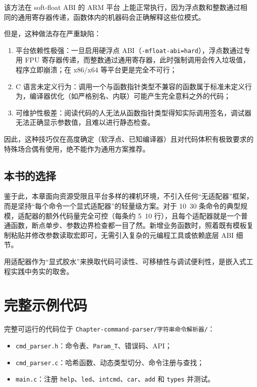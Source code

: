 该方法在 soft-float ABI 的 ARM 平台 上能正常执行，因为浮点数和整数通过相同的通用寄存器传递，函数体内的机器码会正确解释这些位模式。

但是，这种做法存在严重缺陷：

\begin{enumerate}
	\item 平台依赖性极强：一旦启用硬浮点 ABI（\texttt{-mfloat-abi=hard}），浮点数通过专用 FPU 寄存器传递，而整数通过通用寄存器，此时强制调用会传入垃圾值，程序立即崩溃；在 x86/x64 等平台更是完全不可行；
	\item C 语言未定义行为：调用一个与函数指针类型不兼容的函数属于标准未定义行为，编译器优化（如严格别名、内联）可能产生完全意料之外的代码；
	\item 可维护性极差：阅读代码的人无法从函数指针类型得知实际调用签名，调试器无法正确显示参数值，且难以进行静态检查。
\end{enumerate}

因此，这种技巧仅在高度确定（软浮点、已知编译器）且对代码体积有极致要求的特殊场合偶有使用，绝不能作为通用方案推荐。

\subsection*{本书的选择}

鉴于此，本章面向资源受限且平台多样的裸机环境，不引入任何“无适配器”框架，而是坚持“每个命令一个显式适配器”的轻量级方案。对于 10~30 条命令的典型规模，适配器的额外代码量完全可控（每条约 5~10 行），且每个适配器就是一个普通函数，断点单步、参数边界检查都一目了然。新增业务函数时，照着既有模板复制粘贴并修改参数读取宏即可，无需引入复杂的元编程工具或依赖底层 ABI 细节。

用适配器作为“显式胶水”来换取代码可读性、可移植性与调试便利性，是嵌入式工程实践中务实的取舍。

\section{完整示例代码}

完整可运行的代码位于 \texttt{Chapter-command-parser/字符串命令解析器/}：

\begin{itemize}
\item \texttt{cmd\_parser.h}：命令表、\texttt{Param\_T}、错误码、API；
\item \texttt{cmd\_parser.c}：哈希函数、动态类型切分、命令注册与查找；
\item \texttt{main.c}：注册 \texttt{help}、\texttt{led}、\texttt{intcmd}、\texttt{car}、\texttt{add} 和 \texttt{types} 并测试。
\end{itemize}

